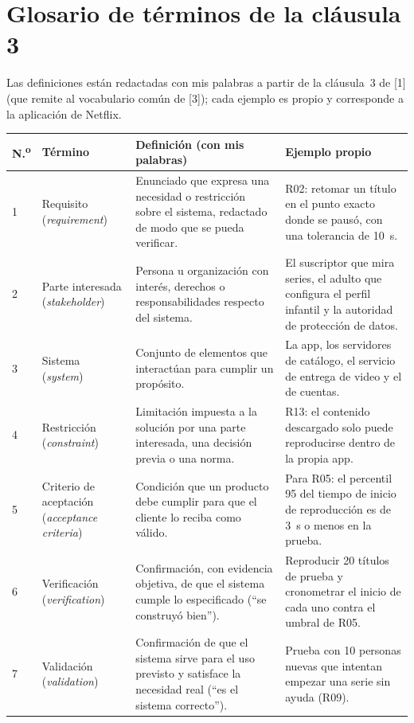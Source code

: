 \documentclass[11pt,a4paper]{article}
\begin{document}
\section{Glosario de t\'erminos de la cl\'ausula 3}
Las definiciones est\'an redactadas con mis palabras a partir de la cl\'ausula~3 de [1] (que remite al vocabulario com\'un de [3]); cada ejemplo es propio y corresponde a la aplicaci\'on de Netflix.

\begin{longtable}{@{}p{0.5cm}p{2.6cm}p{5.7cm}p{5.6cm}@{}}
\toprule
\textbf{N.\textsuperscript{o}} & \textbf{T\'ermino} & \textbf{Definici\'on (con mis palabras)} & \textbf{Ejemplo propio}\\
\midrule\endhead
1 & Requisito (\emph{requirement}) & Enunciado que expresa una necesidad o restricci\'on sobre el sistema, redactado de modo que se pueda verificar. & R02: retomar un t\'itulo en el punto exacto donde se pausó, con una tolerancia de 10~s.\\
2 & Parte interesada (\emph{stakeholder}) & Persona u organizaci\'on con inter\'es, derechos o responsabilidades respecto del sistema. & El suscriptor que mira series, el adulto que configura el perfil infantil y la autoridad de protecci\'on de datos.\\
3 & Sistema (\emph{system}) & Conjunto de elementos que interact\'uan para cumplir un prop\'osito. & La app, los servidores de cat\'alogo, el servicio de entrega de video y el de cuentas.\\
4 & Restricci\'on (\emph{constraint}) & Limitaci\'on impuesta a la soluci\'on por una parte interesada, una decisi\'on previa o una norma. & R13: el contenido descargado solo puede reproducirse dentro de la propia app.\\
5 & Criterio de aceptaci\'on (\emph{acceptance criteria}) & Condici\'on que un producto debe cumplir para que el cliente lo reciba como v\'alido. & Para R05: el percentil 95 del tiempo de inicio de reproducci\'on es de 3~s o menos en la prueba.\\
6 & Verificaci\'on (\emph{verification}) & Confirmaci\'on, con evidencia objetiva, de que el sistema cumple lo especificado (``se construy\'o bien''). & Reproducir 20 t\'itulos de prueba y cronometrar el inicio de cada uno contra el umbral de R05.\\
7 & Validaci\'on (\emph{validation}) & Confirmaci\'on de que el sistema sirve para el uso previsto y satisface la necesidad real (``es el sistema correcto''). & Prueba con 10 personas nuevas que intentan empezar una serie sin ayuda (R09).\\

\end{longtable}
\end{document}
